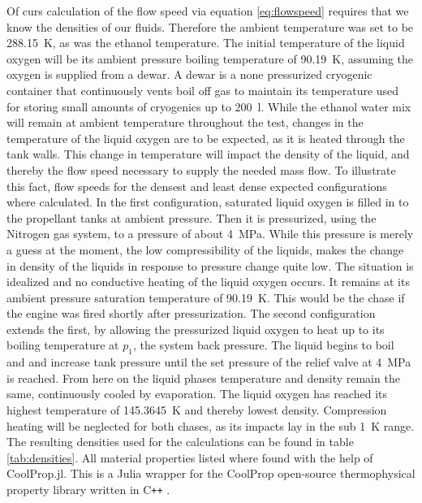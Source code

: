                Of curs calculation of the flow speed via equation \ref{eq:flowspeed} requires that we know the densities of our fluids. Therefore the ambient temperature was set to be \qty{288.15}{K}, as was the ethanol temperature. The initial temperature of the liquid oxygen will be its ambient pressure boiling temperature of \qty{90.19}{K}, assuming the oxygen is supplied from a dewar. A dewar is a none pressurized cryogenic container that continuously vents boil off gas to maintain its temperature used for storing small amounts of cryogenics up to \qty{200}{l}. While the ethanol water mix will remain at ambient temperature throughout the test, changes in the temperature of the liquid oxygen are to be expected, as it is heated through the tank walls. This change in temperature will impact the density of the liquid, and thereby the flow speed necessary to supply the needed mass flow. To illustrate this fact, flow speeds for the densest and least dense expected configurations where calculated. In the first configuration, saturated liquid oxygen is filled in to the propellant tanks at ambient pressure. Then it is pressurized, using the Nitrogen gas system, to a pressure of about \qty{4}{MPa}. While this pressure is merely a guess at the moment, the low compressibility of the liquids, makes the change in density of the liquids in response to pressure change quite low. The situation is idealized and no conductive heating of the liquid oxygen occurs. It remains at its ambient pressure saturation temperature of \qty{90.19}{K}. This would be the chase if the engine was fired shortly after pressurization. The second configuration extends the first, by allowing the pressurized liquid oxygen to heat up to its boiling temperature at $p_1$, the system back pressure. The liquid begins to boil and and increase tank pressure until the set pressure of the relief valve at \qty{4}{MPa} is reached. From here on the liquid phases temperature and density remain the same, continuously cooled by evaporation. The liquid oxygen has reached its highest temperature of \qty{145.3645}{K} and thereby lowest density. Compression heating will be neglected for both chases, as its impacts lay in the sub \qty{1}{K} range. The resulting densities used for the calculations can be found in table \ref{tab:densities}. All material properties listed where found with the help of CoolProp.jl. This is a Julia wrapper for the CoolProp open-source thermophysical property library written in C\texttt{++} \cite{coolprop_article}.
